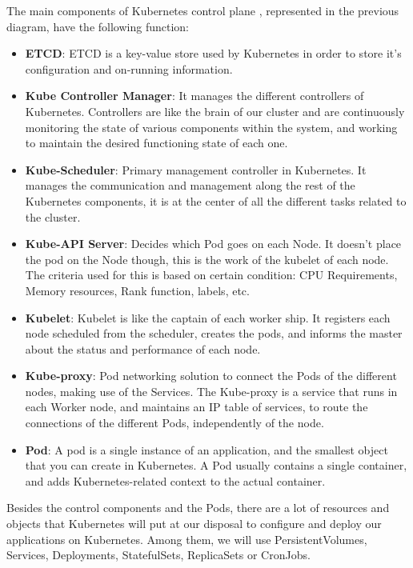 The main components of Kubernetes control plane \cite{cka-course}, represented in the previous diagram, have the following function:
\begin{itemize}
\item \textbf{ETCD}:  ETCD is a key-value store used by Kubernetes in order to store it's configuration and on-running information.

\item \textbf{Kube Controller Manager}: It manages the different controllers of Kubernetes. Controllers are like the brain of our cluster and are continuously monitoring the state of various components within the system, and working to maintain the desired functioning state of each one.

\item \textbf{Kube-Scheduler}: Primary management controller in Kubernetes. It manages the communication and management along the rest of the Kubernetes components, it is at the center of all the different tasks related to the cluster.

\item \textbf{Kube-API Server}: Decides which Pod goes on each Node. It doesn't place the pod on the Node though, this is the work of the kubelet of each node. The criteria used for this is based on certain condition: CPU Requirements, Memory resources, Rank function, labels, etc.

\item \textbf{Kubelet}: Kubelet is like the captain of each worker ship. It registers each node scheduled from the scheduler, creates the pods, and informs the master about the status and performance of each node. 

\item \textbf{Kube-proxy}: Pod networking solution to connect the Pods of the different nodes, making use of the Services. The Kube-proxy is a service that runs in each Worker node, and maintains an IP table of services, to route the connections of the different Pods, independently of the node.

\item \textbf{Pod}: A pod is a single instance of an application, and the smallest object that you can create in Kubernetes. A Pod usually contains a single container, and adds Kubernetes-related context to the actual container.
\end{itemize}

Besides the control components and the Pods, there are a lot of resources and objects that Kubernetes will put at our disposal to configure and deploy our applications on Kubernetes. Among them, we will use PersistentVolumes, Services, Deployments, StatefulSets, ReplicaSets or CronJobs.

